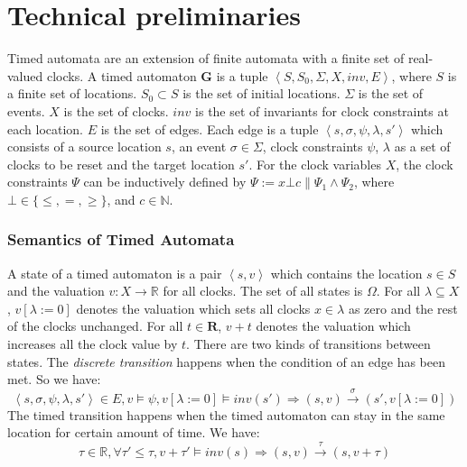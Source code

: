 \section{Technical preliminaries}
\label{preliminaries}
Timed automata \cite{timed_automata} are an extension of finite automata with a finite set of real-valued clocks. 
A timed automaton \textbf{G} is a tuple $\left\langle S,S_0,\Sigma,X,inv,E\right\rangle$, where
 $S$ is a finite set of locations.
 $S_0\subset S$ is the set of initial locations.
 $\Sigma$ is the set of events.
$X$ is the set of clocks.
$inv$ is the set of invariants for clock constraints at each location.
 $E$ is the set of edges. Each edge is a tuple $\left\langle s,\sigma,\psi,\lambda,s'\right\rangle$ which consists of a source location $s$, an event $\sigma\in\Sigma$, clock constraints $\psi$, $\lambda$ as a set of clocks to be reset and the target location $s'$. For the clock variables $X$, the clock constraints $\Psi$ can be inductively defined by $\Psi:=x\bot c\|\Psi_1\wedge\Psi_2$, where $\bot\in\{\leq,=,\geq\}$, and $c\in\mathbb{N}$.
\vspace{-10pt}
\subsubsection{Semantics of Timed Automata}
A state of a timed automaton is a pair $\left\langle s,v\right\rangle$ which contains the location $s\in S$ and the valuation $v:X\rightarrow \mathbb{R}$ for all clocks. The set of all states is $\Omega$. 
For all $\lambda\subseteq X$, $v[\lambda :=0]$ denotes the valuation which sets all clocks $x\in\lambda$ as zero and the rest of the clocks unchanged. For all $t\in \textbf{R}$, $v+t$ denotes the valuation which increases all the clock value by $t$. There are two kinds of transitions between states. The \emph{discrete transition} happens when the condition of an edge has been met. So we have:
$$\left\langle s,\sigma,\psi,\lambda,s'\right\rangle\in E,v\models \psi,v[\lambda :=0]\models inv(s')\Rightarrow (s,v)\xrightarrow{\sigma}(s',v[\lambda :=0])$$
The \textsf{timed transition} happens when the timed automaton can stay in the same location for certain amount of time. We have:
$$\tau\in \mathbb{R},\forall \tau'\leq\tau, v+\tau'\models inv(s)\Rightarrow (s,v)\xrightarrow{\tau}(s,v+\tau)$$
\vspace{-15pt}
